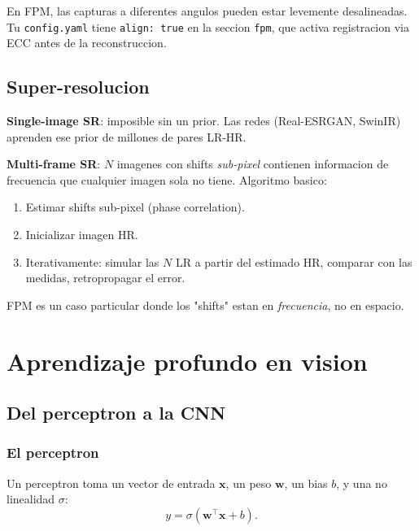 \documentclass[11pt,a4paper,twoside,openright]{book}
\begin{document}
\begin{pipeline}
En FPM, las capturas a diferentes angulos pueden estar levemente desalineadas. Tu \texttt{config.yaml} tiene \texttt{align: true} en la seccion \texttt{fpm}, que activa registracion via ECC antes de la reconstruccion.
\end{pipeline}

\chapter{Super-resolucion}

\textbf{Single-image SR}: imposible sin un prior. Las redes (Real-ESRGAN, SwinIR) aprenden ese prior de millones de pares LR-HR.

\textbf{Multi-frame SR}: $N$ imagenes con shifts \emph{sub-pixel} contienen informacion de frecuencia que cualquier imagen sola no tiene. Algoritmo basico:

\begin{enumerate}[leftmargin=2em]
  \item Estimar shifts sub-pixel (phase correlation).
  \item Inicializar imagen HR.
  \item Iterativamente: simular las $N$ LR a partir del estimado HR, comparar con las medidas, retropropagar el error.
\end{enumerate}

FPM es un caso particular donde los "shifts" estan en \emph{frecuencia}, no en espacio.

\part{Aprendizaje profundo en vision}

\chapter{Del perceptron a la CNN}
\label{ch:cnn}

\section{El perceptron}

Un perceptron toma un vector de entrada $\mathbf{x}$, un peso $\mathbf{w}$, un bias $b$, y una no linealidad $\sigma$:
\begin{equation}
y = \sigma(\mathbf{w}^\top \mathbf{x} + b).
\end{equation}
\end{document}
